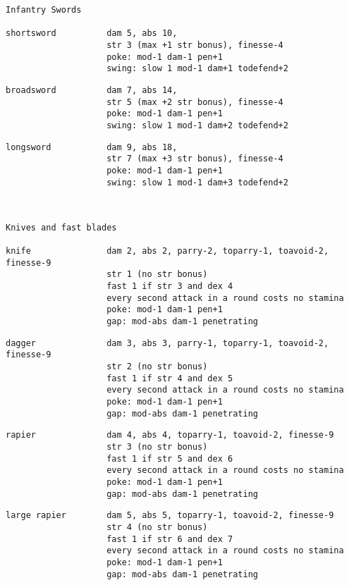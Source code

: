 \goodbreak \small \begin{samepage} \begin{verbatim}
Infantry Swords

shortsword          dam 5, abs 10,
                    str 3 (max +1 str bonus), finesse-4
                    poke: mod-1 dam-1 pen+1
                    swing: slow 1 mod-1 dam+1 todefend+2
\end{verbatim} \blocklistgap \begin{verbatim}
broadsword          dam 7, abs 14,
                    str 5 (max +2 str bonus), finesse-4
                    poke: mod-1 dam-1 pen+1
                    swing: slow 1 mod-1 dam+2 todefend+2
\end{verbatim} \blocklistgap \begin{verbatim}
longsword           dam 9, abs 18,
                    str 7 (max +3 str bonus), finesse-4
                    poke: mod-1 dam-1 pen+1
                    swing: slow 1 mod-1 dam+3 todefend+2
\end{verbatim} \end{samepage} \normalsize \goodbreak

\

\goodbreak \small \begin{samepage} \begin{verbatim}
Knives and fast blades

knife               dam 2, abs 2, parry-2, toparry-1, toavoid-2, finesse-9
                    str 1 (no str bonus)
                    fast 1 if str 3 and dex 4
                    every second attack in a round costs no stamina
                    poke: mod-1 dam-1 pen+1
                    gap: mod-abs dam-1 penetrating
\end{verbatim} \blocklistgap \begin{verbatim}
dagger              dam 3, abs 3, parry-1, toparry-1, toavoid-2, finesse-9
                    str 2 (no str bonus)
                    fast 1 if str 4 and dex 5
                    every second attack in a round costs no stamina
                    poke: mod-1 dam-1 pen+1
                    gap: mod-abs dam-1 penetrating
\end{verbatim} \blocklistgap \begin{verbatim}
rapier              dam 4, abs 4, toparry-1, toavoid-2, finesse-9
                    str 3 (no str bonus)
                    fast 1 if str 5 and dex 6
                    every second attack in a round costs no stamina
                    poke: mod-1 dam-1 pen+1
                    gap: mod-abs dam-1 penetrating
\end{verbatim} \blocklistgap \begin{verbatim}
large rapier        dam 5, abs 5, toparry-1, toavoid-2, finesse-9
                    str 4 (no str bonus)
                    fast 1 if str 6 and dex 7
                    every second attack in a round costs no stamina
                    poke: mod-1 dam-1 pen+1
                    gap: mod-abs dam-1 penetrating
\end{verbatim} \end{samepage} \normalsize \goodbreak

